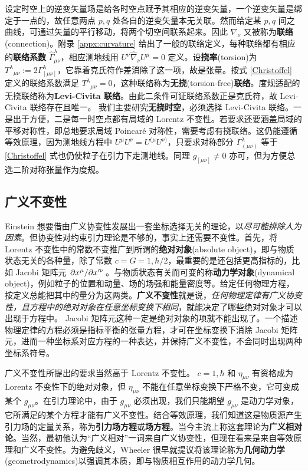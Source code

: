 设定时空上的逆变矢量场是给各时空点赋予其相应的逆变矢量，一个逆变矢量是绑定于一点的，故任意两点 $p,q$ 处各自的逆变矢量本无关联。然而给定某 $p,q$ 间之曲线，可通过矢量的平行移动，将两个切空间联系起来。因此 $\nabla_\nu$ 又被称为\textbf{联络}(connection)。附录 \ref{appx:curvature} 给出了一般的联络定义，每种联络都有相应的\textbf{联络系数} $\hat{\Gamma}^\lambda_{\mu\nu}$，相应测地线用 $U^\nu\hat\nabla_\nu U^\mu=0$ 定义。设\textbf{挠率}(torsion)为 $T^\lambda{}_{\mu\nu}:=2\Gamma^\lambda_{[\mu\nu]}$，它靠着克氏符作差消除了这一项，故是张量。按式 \eqref{Christoffel} 定义的联络系数满足 $T^\lambda{}_{\mu\nu}=0$，这种联络称为\textbf{无挠}(torsion-free)\textbf{联络}。度规适配的无挠联络称为\textbf{Levi-Civita 联络}。由此二条件可证联络系数正是克氏符，故 Levi-Civita 联络存在且唯一。
我们主要研究\textbf{无挠时空}，必须选择 Levi-Civita 联络。一是出于方便，二是每一时空点都有局域的 Lorentz 不变性。若要求还要涵盖局域的平移对称性，即总地要求局域 Poincaré 对称性，需要考虑有挠联络。这仍能遵循等效原理，因为测地线方程中 $U^\mu U^\nu=U^{(\mu} U^{\nu)}$，只要求对称部分 $\Gamma^\lambda_{(\mu\nu)}$ 等于 \eqref{Christoffel} 式也仍使粒子在引力下走测地线。同理 $g_{[\mu\nu]}\ne 0$ 亦可，但为方便总选二阶对称张量作为度规。 

\subsection{广义不变性}

Einstein 想要借由广义协变性发展出一套坐标选择无关的理论，以\textit{尽可能排除人为因素}。但协变性对约束引力理论是不够的，事实上还需要不变性。首先，将 Lorentz 不变性中的常数不变推广到所谓的\textbf{绝对对象}(absolute object)，即与物质状态无关的各种量，除了常数 $c=G=1,\hbar/2$，最重要的是还包括更高指标的，比如 Jacobi 矩阵元 $\pdv*{x^\mu}{x'^\nu}$。与物质状态有关而可变的称\textbf{动力学对象}(dynamical object)，例如粒子的位置和动量、场的场强和能量密度等。给定任何物理方程，按定义总能把其中的量分为这两类。\textbf{广义不变性}就是说，\textit{任何物理定律有广义协变性，且方程中的绝对对象在任意坐标变换下相同}，就能决定了哪些绝对对象才可以出现于方程中。
Jacobi 矩阵元这种一定是绝对对象的项就不能出现了。一个描述物理定律的方程必须是指标平衡的张量方程，才可在坐标变换下消除 Jacobi 矩阵元，进而一种坐标系对应方程的一种表达，并保持广义不变性，不会同时出现两种坐标系符号。

广义不变性所提出的要求当然高于 Lorentz 不变性。
$c=1,\hbar$ 和 $\eta_{\mu\nu}$ 有资格成为 Lorentz 不变性下的绝对对象，但 $\eta_{\mu\nu}$ 不能在任意坐标变换下严格不变，它可变成某个 $g_{\mu\nu}$。在引力理论中，由于 $g_{\mu\nu}$ 必须出现，我们只能期望 $g_{\mu\nu}$ 是动力学对象，它所满足的某个方程才能有广义不变性。结合等效原理，我们知道这是物质源产生引力场的定量关系，称为\textbf{引力场方程}或\textbf{场方程}。当今主流上称这套理论为\textbf{广义相对论}。当然，最初他认为“广义相对”一词来自广义协变性，但现在看来是来自等效原理和广义不变性。为避免歧义，Wheeler 很早就提议将该理论称为\textbf{几何动力学}(geometrodynamics)以强调其本质，即与物质相互作用的动力学几何。 

